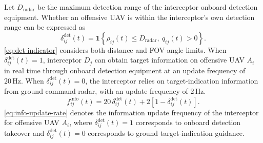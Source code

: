 \documentclass{cja}
\begin{document}
Let $D_{\mathrm{radar}}$ be the maximum detection range of the interceptor onboard detection equipment. Whether an offensive UAV is within the interceptor's own detection range can be expressed as
\begin{equation}
\delta_{ij}^{\mathrm{det}}(t)
=
\mathbf{1}
\left\{
\rho_{ij}(t)\le D_{\mathrm{radar}},\
q_{ij}(t)>0
\right\}.
\label{eq:det-indicator}
\end{equation}
\eqref{eq:det-indicator} considers both distance and FOV-angle limits. When $\delta_{ij}^{\mathrm{det}}(t)=1$, interceptor $D_j$ can obtain target information on offensive UAV $A_i$ in real time through onboard detection equipment at an update frequency of $20\,\mathrm{Hz}$. When $\delta_{ij}^{\mathrm{det}}(t)=0$, the interceptor relies on target-indication information from ground command radar, with an update frequency of $2\,\mathrm{Hz}$.
\begin{equation}
f_{ij}^{\mathrm{info}}(t)
=
20\,\delta_{ij}^{\mathrm{det}}(t)
+
2\left[1-\delta_{ij}^{\mathrm{det}}(t)\right].
\label{eq:info-update-rate}
\end{equation}
\eqref{eq:info-update-rate} denotes the information update frequency of the interceptor for offensive UAV $A_i$, where $\delta_{ij}^{\mathrm{det}}(t)=1$ corresponds to onboard detection takeover and $\delta_{ij}^{\mathrm{det}}(t)=0$ corresponds to ground target-indication guidance.
\end{document}
